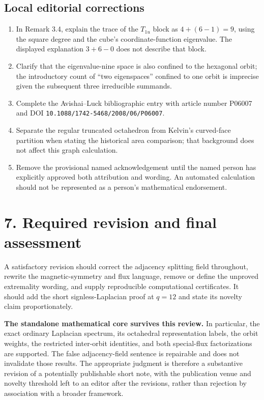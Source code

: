 \documentclass[11pt,a4paper]{article}
\begin{document}
\subsection*{Local editorial corrections}
\begin{enumerate}
\item In Remark 3.4, explain the trace of the $T_{1u}$ block as $4+(6-1)=9$, using the square degree and the cube's coordinate-function eigenvalue. The displayed explanation $3+6-0$ does not describe that block.
\item Clarify that the eigenvalue-nine space is also confined to the hexagonal orbit; the introductory count of ``two eigenspaces'' confined to one orbit is imprecise given the subsequent three irreducible summands.
\item Complete the Avishai--Luck bibliographic entry with article number P06007 and DOI \texttt{10.1088/1742-5468/2008/06/P06007}.
\item Separate the regular truncated octahedron from Kelvin's curved-face partition when stating the historical area comparison; that background does not affect this graph calculation.
\item Remove the provisional named acknowledgement until the named person has explicitly approved both attribution and wording. An automated calculation should not be represented as a person's mathematical endorsement.
\end{enumerate}

\section*{7. Required revision and final assessment}
A satisfactory revision should correct the adjacency splitting field throughout, rewrite the magnetic-symmetry and flux language, remove or define the unproved extremality wording, and supply reproducible computational certificates. It should add the short signless-Laplacian proof at $q=12$ and state its novelty claim proportionately.

\textbf{The standalone mathematical core survives this review.} In particular, the exact ordinary Laplacian spectrum, its octahedral representation labels, the orbit weights, the restricted inter-orbit identities, and both special-flux factorizations are supported. The false adjacency-field sentence is repairable and does not invalidate those results. The appropriate judgment is therefore a substantive revision of a potentially publishable short note, with the publication venue and novelty threshold left to an editor after the revisions, rather than rejection by association with a broader framework.
\end{document}

